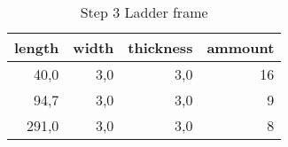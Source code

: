 \begin{table}[h!]
\centering
\caption{Step 3 Ladder frame}
\begin{tabular}{rrrr}
\toprule
 length &  width &  thickness &  ammount \\
\midrule
   40,0 &    3,0 &        3,0 &       16 \\
   94,7 &    3,0 &        3,0 &        9 \\
  291,0 &    3,0 &        3,0 &        8 \\
\bottomrule
\end{tabular}
\end{table}
